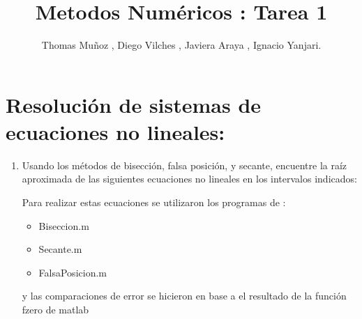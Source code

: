 \documentclass{udparticle}
\title{Metodos Numéricos : Tarea 1}
\author{Thomas Muñoz , Diego Vilches , Javiera Araya , Ignacio Yanjari.}
\begin{document}
\maketitle
\section{Resolución de sistemas de ecuaciones no lineales:}
\begin{enumerate}
\item Usando los métodos de bisección, falsa posición, y secante, encuentre la raíz aproximada 
de las siguientes ecuaciones no lineales en los intervalos indicados:

\begin{enumerate}
    
Para realizar estas ecuaciones se utilizaron los programas de :
\begin{itemize}
    \item Biseccion.m
    \item Secante.m
    \item FalsaPosicion.m
\end{itemize}
y las comparaciones de error se hicieron en base a el resultado de la función fzero de matlab


\end{enumerate}
\end{enumerate}
\end{document}
